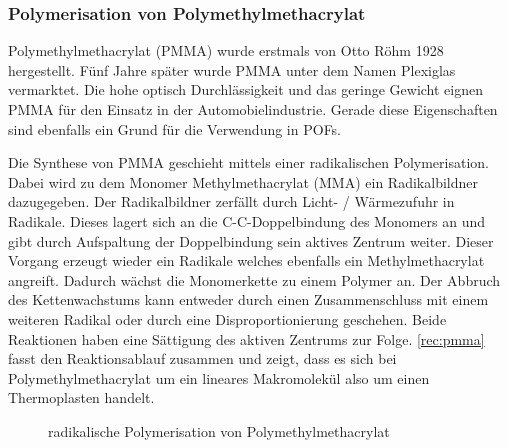 \subsubsection{Polymerisation von Polymethylmethacrylat}
\label{subsec:pofpmma}

Polymethylmethacrylat (PMMA) wurde erstmals von Otto Röhm 1928 hergestellt. Fünf
Jahre später wurde PMMA unter dem Namen
Plexiglas\textsuperscript{\textregistered} vermarktet. Die hohe optisch
Durchlässigkeit und das geringe Gewicht eignen PMMA für den Einsatz in der
Automobielindustrie. Gerade diese Eigenschaften sind ebenfalls ein Grund für die
Verwendung in POFs. \cite{pofwuppmma}

Die Synthese von PMMA geschieht mittels einer radikalischen Polymerisation.
Dabei wird zu dem Monomer Methylmethacrylat (MMA) ein Radikalbildner
dazugegeben. Der Radikalbildner zerfällt durch Licht- / Wärmezufuhr in Radikale.
Dieses lagert sich an die C-C-Doppelbindung des Monomers an und gibt durch
Aufspaltung der Doppelbindung sein aktives Zentrum weiter. Dieser Vorgang
erzeugt wieder ein Radikale welches ebenfalls ein Methylmethacrylat angreift.
Dadurch wächst die Monomerkette zu einem Polymer an. Der Abbruch des
Kettenwachstums kann entweder durch einen Zusammenschluss mit einem weiteren
Radikal oder durch eine Disproportionierung geschehen. Beide Reaktionen haben
eine Sättigung des aktiven Zentrums zur Folge. \autoref{rec:pmma} fasst den
Reaktionsablauf zusammen und zeigt, dass es sich bei Polymethylmethacrylat um
ein lineares Makromolekül also um einen Thermoplasten handelt.

\begin{figure}[H]
    \begin{center}
        \footnotesize
        \setatomsep{1.7em}


        \chemrel{->}

        \caption{radikalische Polymerisation von Polymethylmethacrylat}
        \label{rec:pmma}
    \end{center}
\end{figure}
